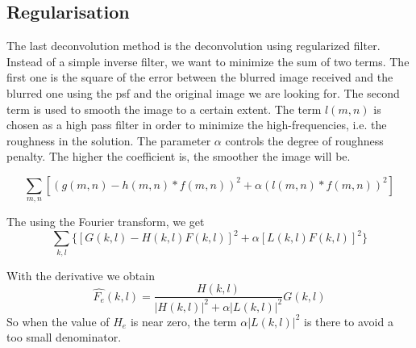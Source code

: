 \subsection{Regularisation}
\label{subsec:Reg}
The last deconvolution method is the deconvolution using regularized filter. 
Instead of a simple inverse filter, we want to minimize the sum of two terms. The first one is the square of the error between the blurred image received and the blurred one using the psf and the original image we are looking for. The second term is used to smooth the image to a certain extent. The term $l(m,n)$ is chosen as a high pass filter in order to minimize the high-frequencies, i.e. the roughness in the solution. The parameter $\alpha$ controls the degree of roughness penalty. The higher the coefficient is, the smoother the image will be. %

\begin{equation}
\sum_{m,n} \left[ (g(m,n) - h(m,n)*f(m,n))^2 + \alpha (l(m,n)*f(m,n))^2 \right]
\end{equation}

The using the Fourier transform, we get
\begin{equation}
\sum_{k,l} \{ [G(k,l) - H(k,l)F(k,l)]^2 + \alpha [L(k,l)F(k,l)]^2\}
\end{equation}

With the derivative we obtain
\begin{equation}
\hat{F_e}(k,l) = \frac{H(k,l)}{|H(k,l)|^2 + \alpha |L(k,l)|^2} G(k,l)
\end{equation}
So when the value of $H_e$ is near zero, the term $\alpha |L(k,l)|^2$ is there to avoid a too small denominator. 

